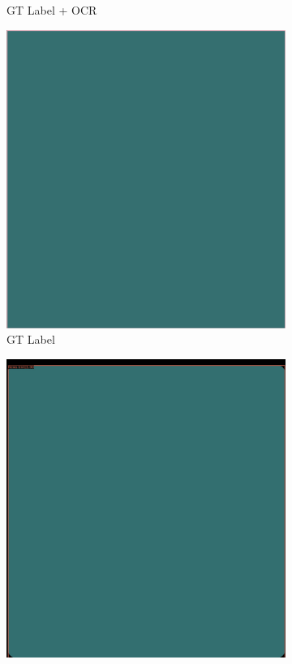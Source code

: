 \documentclass[aspectratio=1610]{beamer}
\begin{document}
\begin{frame}
\begin{figure}
\begin{subfigure}{.25\textwidth}
  \caption{GT Label + OCR}
\end{subfigure}%
\begin{subfigure}{.25\textwidth}
  \centering
  \includegraphics[width=0.99\linewidth, clip=true, trim = 0mm 0mm 0mm 0mm]{figures/bbox/1RoKim0.jpg}
  \caption{GT Label}
\end{subfigure}%
\begin{subfigure}{.25\textwidth}
  \centering
  \includegraphics[width=0.99\linewidth, clip=true, trim = 0mm 0mm 0mm 0mm]{figures/labels-vanilla-0.75/1RoKim0.jpg}

\end{subfigure}
\end{figure}
\end{frame}
\end{document}
